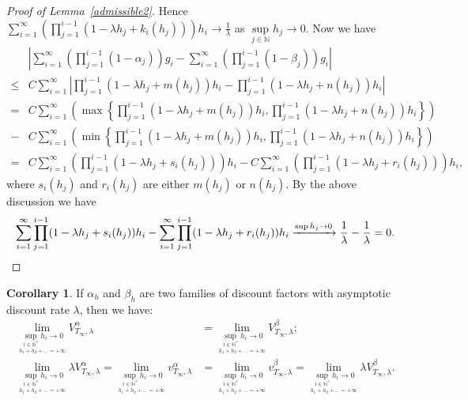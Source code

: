 \documentclass[english,openary,12pt]{article}
\theoremstyle{definition}
\newtheorem{corollary}{Corollary}
\newcommand{\N}{\mathbb{N}}
\begin{document}
\begin{proof}[Proof of Lemma~\ref{admissible2}]
Hence $\sum\limits_{i = 1}^\infty \left(\prod\limits_{j = 1}^{i-1} 
(1 - \lambda h_j + k_i(h_j))\right) h_i \to \frac{1}{\lambda}$ as 
$\sup\limits_{j\in\N} h_j \to 0$. Now we have
\begin{align*}
&\left|\sum\limits_{i = 1}^\infty \left(\prod\limits_{j = 1}^{i-1} 
(1 - \alpha_j) \right) g_i - \sum\limits_{i = 1}^\infty 
\left(\prod\limits_{j = 1}^{i-1} (1 - \beta_j) \right) g_i\right| \\
\le&
C \sum\limits_{i = 1}^\infty 
\left|\prod\limits_{j = 1}^{i-1} (1 - \lambda h_j + m(h_j)) h_i - 
\prod\limits_{j = 1}^{i-1}  (1 - \lambda h_j + n(h_j)) h_i\right| \\
=& C \sum\limits_{i = 1}^\infty
\left(\max\left\{\prod\limits_{j = 1}^{i-1} (1 - \lambda h_j + m(h_j)) h_i,
\prod\limits_{j = 1}^{i-1} (1 - \lambda h_j + n(h_j)) h_i\right\}\right)\\
-&C \sum\limits_{i = 1}^\infty
\left(\min\left\{\prod\limits_{j = 1}^{i-1} (1 - \lambda h_j + m(h_j)) h_i,
\prod\limits_{j = 1}^{i-1} (1 - \lambda h_j + n(h_j)) h_i\right\}\right)\\
=&C \sum\limits_{i = 1}^\infty
\left(\prod\limits_{j = 1}^{i-1} (1 - \lambda h_j + s_i(h_j))\right) h_i 
-C \sum\limits_{i = 1}^\infty 
\left(\prod\limits_{j = 1}^{i-1} (1 - \lambda h_j + r_i(h_j))\right) h_i,
\end{align*}
where $s_i(h_j)$ and $r_i(h_j)$ are either $m(h_j)$ or $n(h_j)$.
By the above discussion we have
\[\sum\limits_{i = 1}^\infty \prod\limits_{j = 1}^{i-1} 
(1 - \lambda h_j + s_i(h_j)) h_i - \sum\limits_{i = 1}^\infty 
\prod\limits_{j = 1}^{i-1}  (1 - \lambda h_j + r_i(h_j)) 
h_i \xrightarrow{\sup\nolimits h_j \to 0} 
\frac{1}{\lambda} - \frac{1}{\lambda} = 0. \qedhere\]
\end{proof}

\begin{corollary}
\label{mlvpp}
If $\alpha_h$ and $\beta_h$ are two families of discount factors with 
asymptotic discount rate $\lambda$, then we have:
\begin{align}
\lim_{\underset{h_1+h_2+\ldots = +\infty}{\sup_{i\in\N^*} h_i \to 0}} 
V^\alpha_{T_\infty,\lambda} &=
\lim_{\underset{h_1+h_2+\ldots = +\infty}{\sup_{i\in\N^*} h_i \to 0}} 
V^\beta_{T_\infty,\lambda}; \label{rx3001}\\ 
\lim_{\underset{h_1+h_2+\ldots = +\infty}{\sup_{i\in\N^*} h_i \to 0}} 
\lambda V^\alpha_{T_\infty,\lambda} =
\lim_{\underset{h_1+h_2+\ldots = +\infty}{\sup_{i\in\N^*} h_i \to 0}} 
v^\alpha_{T_\infty,\lambda} &= 
\lim_{\underset{h_1+h_2+\ldots = +\infty}{\sup_{i\in\N^*} h_i \to 0}} v
^{\beta}_{T_\infty,\lambda} =
\lim_{\underset{h_1+h_2+\ldots = +\infty}{\sup_{i\in\N^*} h_i \to 0}} 
\lambda V^\beta_{T_\infty,\lambda}. \label{rx3002}
\end{align}
\end{corollary}
\end{document}
